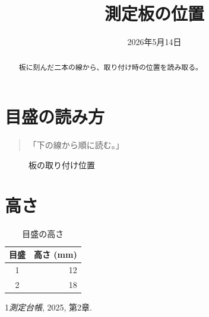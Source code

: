 \documentclass{article}
\begin{document}
\title{測定板の位置}\author{}\date{2026年5月14日}\maketitle
\begin{abstract}板に刻んだ二本の線から、取り付け時の位置を読み取る。\end{abstract}
\tableofcontents
\section{目盛の読み方}\begin{quote}「下の線から順に読む。」\end{quote}
\begin{figure}[ht]\centering\fbox{\rule{0pt}{8mm}\rule{33mm}{0pt}}\caption{板の取り付け位置}\end{figure}
\section{高さ}
\begin{table}[ht]\centering\begin{tabular}{cr}目盛&高さ (mm)\\\hline 1&12\\2&18\end{tabular}\caption{目盛の高さ}\end{table}
\begin{thebibliography}{1}\emph{測定台帳}, 2025, 第2章.\end{thebibliography}
\end{document}
